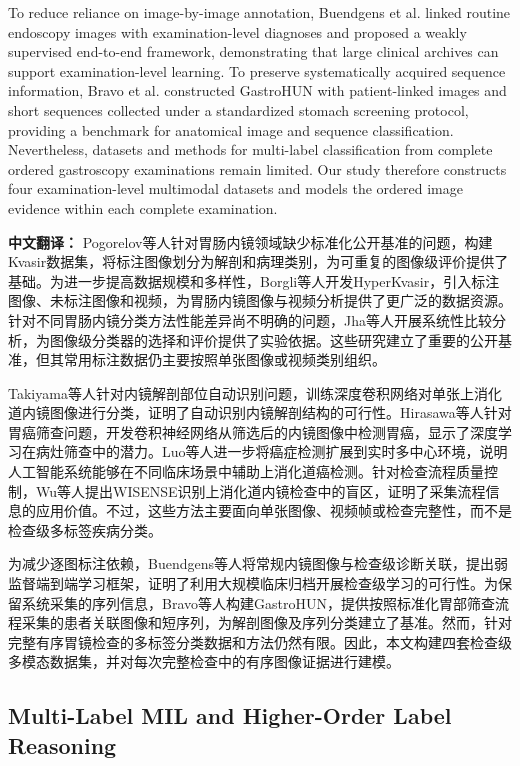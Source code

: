 \documentclass[Afour,sagev,times]{sagej}
\begin{document}
To reduce reliance on image-by-image annotation, Buendgens et al. linked routine endoscopy images with examination-level diagnoses and proposed a weakly supervised end-to-end framework, demonstrating that large clinical archives can support examination-level learning.\cite{R8} To preserve systematically acquired sequence information, Bravo et al. constructed GastroHUN with patient-linked images and short sequences collected under a standardized stomach screening protocol, providing a benchmark for anatomical image and sequence classification.\cite{R9} Nevertheless, datasets and methods for multi-label classification from complete ordered gastroscopy examinations remain limited. Our study therefore constructs four examination-level multimodal datasets and models the ordered image evidence within each complete examination.

\noindent\textbf{中文翻译：}
Pogorelov等人针对胃肠内镜领域缺少标准化公开基准的问题，构建Kvasir数据集，将标注图像划分为解剖和病理类别，为可重复的图像级评价提供了基础。为进一步提高数据规模和多样性，Borgli等人开发HyperKvasir，引入标注图像、未标注图像和视频，为胃肠内镜图像与视频分析提供了更广泛的数据资源。针对不同胃肠内镜分类方法性能差异尚不明确的问题，Jha等人开展系统性比较分析，为图像级分类器的选择和评价提供了实验依据。这些研究建立了重要的公开基准，但其常用标注数据仍主要按照单张图像或视频类别组织。

Takiyama等人针对内镜解剖部位自动识别问题，训练深度卷积网络对单张上消化道内镜图像进行分类，证明了自动识别内镜解剖结构的可行性。Hirasawa等人针对胃癌筛查问题，开发卷积神经网络从筛选后的内镜图像中检测胃癌，显示了深度学习在病灶筛查中的潜力。Luo等人进一步将癌症检测扩展到实时多中心环境，说明人工智能系统能够在不同临床场景中辅助上消化道癌检测。针对检查流程质量控制，Wu等人提出WISENSE识别上消化道内镜检查中的盲区，证明了采集流程信息的应用价值。不过，这些方法主要面向单张图像、视频帧或检查完整性，而不是检查级多标签疾病分类。

为减少逐图标注依赖，Buendgens等人将常规内镜图像与检查级诊断关联，提出弱监督端到端学习框架，证明了利用大规模临床归档开展检查级学习的可行性。为保留系统采集的序列信息，Bravo等人构建GastroHUN，提供按照标准化胃部筛查流程采集的患者关联图像和短序列，为解剖图像及序列分类建立了基准。然而，针对完整有序胃镜检查的多标签分类数据和方法仍然有限。因此，本文构建四套检查级多模态数据集，并对每次完整检查中的有序图像证据进行建模。

\subsection{Multi-Label MIL and Higher-Order Label Reasoning}
\end{document}
